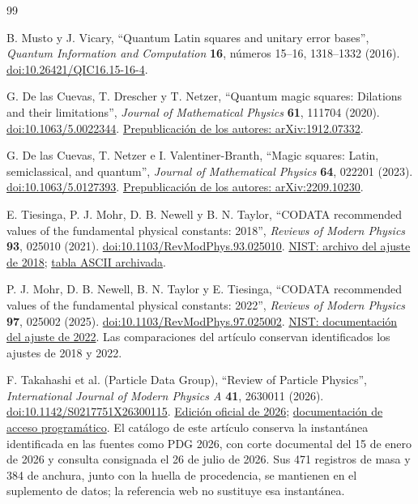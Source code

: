 \begin{thebibliography}{99}
\setlength{\itemsep}{0.10\baselineskip}
{}

B. Musto y J. Vicary,
``Quantum Latin squares and unitary error bases'',
\emph{Quantum Information and Computation} \textbf{16},
números 15--16, 1318--1332 (2016).
\href{https://doi.org/10.26421/QIC16.15-16-4}{doi:10.26421/QIC16.15-16-4}.

G. De las Cuevas, T. Drescher y T. Netzer,
``Quantum magic squares: Dilations and their limitations'',
\emph{Journal of Mathematical Physics} \textbf{61}, 111704 (2020).
\href{https://doi.org/10.1063/5.0022344}{doi:10.1063/5.0022344}.
\href{https://arxiv.org/abs/1912.07332}{Prepublicación de los autores: arXiv:1912.07332}.

G. De las Cuevas, T. Netzer e I. Valentiner-Branth,
``Magic squares: Latin, semiclassical, and quantum'',
\emph{Journal of Mathematical Physics} \textbf{64}, 022201 (2023).
\href{https://doi.org/10.1063/5.0127393}{doi:10.1063/5.0127393}.
\href{https://arxiv.org/abs/2209.10230}{Prepublicación de los autores: arXiv:2209.10230}.

E. Tiesinga, P. J. Mohr, D. B. Newell y B. N. Taylor,
``CODATA recommended values of the fundamental physical constants: 2018'',
\emph{Reviews of Modern Physics} \textbf{93}, 025010 (2021).
\href{https://doi.org/10.1103/RevModPhys.93.025010}{doi:10.1103/RevModPhys.93.025010}.
\href{https://physics.nist.gov/cuu/Constants/archive2018.html}{NIST: archivo del ajuste de 2018};
\href{https://physics.nist.gov/cuu/Constants/ArchiveASCII/allascii_2018.txt}{tabla ASCII archivada}.

P. J. Mohr, D. B. Newell, B. N. Taylor y E. Tiesinga,
``CODATA recommended values of the fundamental physical constants: 2022'',
\emph{Reviews of Modern Physics} \textbf{97}, 025002 (2025).
\href{https://doi.org/10.1103/RevModPhys.97.025002}{doi:10.1103/RevModPhys.97.025002}.
\href{https://physics.nist.gov/cuu/Constants/article2022.html}{NIST: documentación del ajuste de 2022}.
Las comparaciones del artículo conservan identificados los ajustes de 2018 y 2022.

F. Takahashi et al. (Particle Data Group),
``Review of Particle Physics'',
\emph{International Journal of Modern Physics A} \textbf{41}, 2630011 (2026).
\href{https://doi.org/10.1142/S0217751X26300115}{doi:10.1142/S0217751X26300115}.
\href{https://pdg.lbl.gov/2026/}{Edición oficial de 2026};
\href{https://pdg.lbl.gov/2026/api/index.html}{documentación de acceso programático}.
El catálogo de este artículo conserva la instantánea identificada en las fuentes
como PDG 2026, con corte documental del 15 de enero de 2026 y consulta consignada
el 26 de julio de 2026. Sus 471 registros de masa y 384 de anchura, junto con la
huella de procedencia, se mantienen en el suplemento de datos; la referencia
web no sustituye esa instantánea.

\end{thebibliography}
